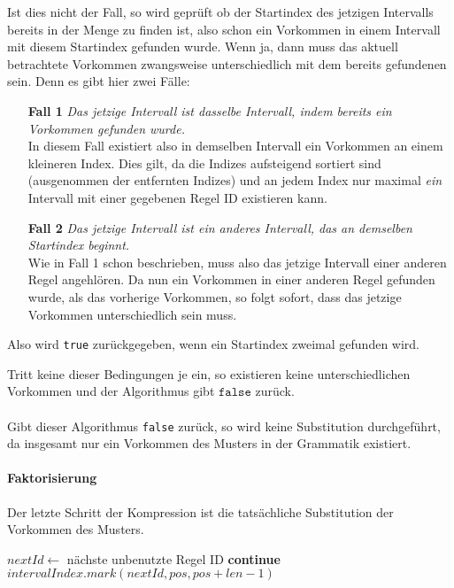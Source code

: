 Ist dies nicht der Fall, so wird geprüft ob der Startindex des jetzigen Intervalls bereits in der Menge zu finden ist, also schon ein Vorkommen in einem Intervall mit diesem Startindex gefunden wurde. Wenn ja, dann muss das aktuell betrachtete Vorkommen zwangsweise unterschiedlich mit dem bereits gefundenen sein. Denn es gibt hier zwei Fälle:
\begin{itemize}
    \item[\textbf{Fall 1}] \emph{Das jetzige Intervall ist dasselbe Intervall, indem bereits ein Vorkommen gefunden wurde.}\\
    In diesem Fall existiert also in demselben Intervall ein Vorkommen an einem kleineren Index. Dies gilt, da die Indizes aufsteigend sortiert sind (ausgenommen der entfernten Indizes) und an jedem Index nur maximal \emph{ein} Intervall mit einer gegebenen Regel ID existieren kann. 
    \item[\textbf{Fall 2}] \emph{Das jetzige Intervall ist ein anderes Intervall, das an demselben Startindex beginnt.}\\
    Wie in Fall 1 schon beschrieben, muss also das jetzige Intervall einer anderen Regel angehlören. Da nun ein Vorkommen in einer anderen Regel gefunden wurde, als das vorherige Vorkommen, so folgt sofort, dass das jetzige Vorkommen unterschiedlich sein muss. 
\end{itemize}   
Also wird \texttt{true} zurückgegeben, wenn ein Startindex zweimal gefunden wird.

Tritt keine dieser Bedingungen je ein, so existieren keine unterschiedlichen Vorkommen und der Algorithmus gibt $\texttt{false}$ zurück.\\\\
Gibt dieser Algorithmus \texttt{false} zurück, so wird keine Substitution durchgeführt, da insgesamt nur ein Vorkommen des Musters in der Grammatik existiert.

\newpage
\paragraph{Faktorisierung}

Der letzte Schritt der Kompression ist die tatsächliche Substitution der Vorkommen des Musters.
\begin{algorithm}
        $nextId \leftarrow$ nächste unbenutzte Regel ID\;
         {
             {
                \textbf{continue}\;
            }
            $intervalIndex.mark(nextId, pos, pos + len - 1)$\;
        }
\end{algorithm}

